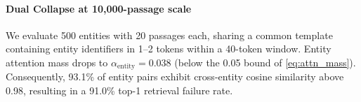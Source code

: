 \documentclass[11pt,a4paper,twocolumn]{article}
\begin{document}
\paragraph{Dual Collapse at 10{,}000-passage scale}
We evaluate 500 entities with 20 passages each, sharing a common
template containing entity identifiers in 1--2 tokens within a
40-token window. Entity attention mass drops to
$\alpha_{\text{entity}} = 0.038$ (below the 0.05 bound of
\cref{eq:attn_mass}). Consequently, 93.1\% of entity pairs exhibit
cross-entity cosine similarity above 0.98, resulting in a
91.0\% top-1 retrieval failure rate.




\end{document}
